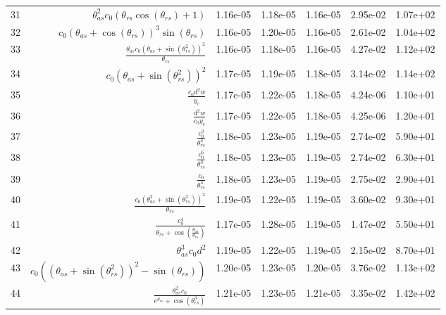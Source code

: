 \begin{tabularx}{\textwidth}{lRRRRRl}
31  &  $ \theta_{as}^{2} c_{0} \left(\theta_{rs} \cos{\left(\theta_{rs} \right)} + 1\right) $  &  1.16e-05  &  1.18e-05  &  1.16e-05  &  2.95e-02  &  1.07e+02  \\ 
32  &  $ c_{0} \left(\theta_{as} + \cos{\left(\theta_{rs} \right)}\right)^{3} \sin{\left(\theta_{rs} \right)} $  &  1.16e-05  &  1.20e-05  &  1.16e-05  &  2.61e-02  &  1.04e+02  \\ 
33  &  $ \displaystyle\frac{\theta_{as} c_{0} \left(\theta_{as} + \sin{\left(\theta_{rs}^{2} \right)}\right)^{2}}{\theta_{rs}} $  &  1.16e-05  &  1.18e-05  &  1.16e-05  &  4.27e-02  &  1.12e+02  \\ 
34  &  $ c_{0} \left(\theta_{as} + \sin{\left(\theta_{rs}^{2} \right)}\right)^{2} $  &  1.17e-05  &  1.19e-05  &  1.18e-05  &  3.14e-02  &  1.14e+02  \\ 
35  &  $ \displaystyle\frac{c_{0} d^{2} w}{y_c} $  &  1.17e-05  &  1.22e-05  &  1.18e-05  &  4.24e-06  &  1.10e+01  \\ 
36  &  $ \displaystyle\frac{d^{2} w}{c_{0} y_c} $  &  1.17e-05  &  1.22e-05  &  1.18e-05  &  4.25e-06  &  1.20e+01  \\ 
37  &  $ \displaystyle\frac{c_{0}^{3}}{\theta_{rs}^{3}} $  &  1.18e-05  &  1.23e-05  &  1.19e-05  &  2.74e-02  &  5.90e+01  \\ 
38  &  $ \displaystyle\frac{c_{0}^{6}}{\theta_{rs}^{3}} $  &  1.18e-05  &  1.23e-05  &  1.19e-05  &  2.74e-02  &  6.30e+01  \\ 
39  &  $ \displaystyle\frac{c_{0}}{\theta_{rs}^{3}} $  &  1.18e-05  &  1.23e-05  &  1.19e-05  &  2.75e-02  &  2.90e+01  \\ 
40  &  $ \displaystyle\frac{c_{0} \left(\theta_{as}^{2} + \sin{\left(\theta_{rs}^{2} \right)}\right)^{2}}{\theta_{rs}} $  &  1.19e-05  &  1.22e-05  &  1.19e-05  &  3.60e-02  &  9.30e+01  \\ 
41  &  $ \displaystyle\frac{c_{0}^{4}}{\theta_{rs} + \cos{\left(\displaystyle\frac{\theta_{as}}{\theta_{rs}} \right)}} $  &  1.17e-05  &  1.28e-05  &  1.19e-05  &  1.47e-02  &  5.50e+01  \\ 
42  &  $ \theta_{as}^{3} c_{0} d^{2} $  &  1.19e-05  &  1.22e-05  &  1.19e-05  &  2.15e-02  &  8.70e+01  \\ 
43  &  $ c_{0} \left(\left(\theta_{as} + \sin{\left(\theta_{rs}^{2} \right)}\right)^{2} - \sin{\left(\theta_{rs} \right)}\right) $  &  1.20e-05  &  1.23e-05  &  1.20e-05  &  3.76e-02  &  1.13e+02  \\ 
44  &  $ \displaystyle\frac{\theta_{as}^{2} c_{0}}{e^{\theta_{rs}} + \cos{\left(\theta_{rs}^{3} \right)}} $  &  1.21e-05  &  1.23e-05  &  1.21e-05  &  3.35e-02  &  1.42e+02  \\ 

\end{tabularx}
